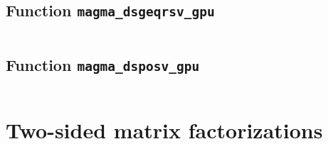 \documentclass[10pt]{book}
\begin{document}
\newpage
\subsection{Function {\tt {\bf magma\_dsgeqrsv\_gpu}}}
\begin{verbatim}
\end{verbatim}

\newpage
\subsection{Function {\tt {\bf magma\_dsposv\_gpu}}}
\begin{verbatim}
\end{verbatim}


\newpage
\section{Two-sided matrix factorizations}

\newpage
\end{document}

